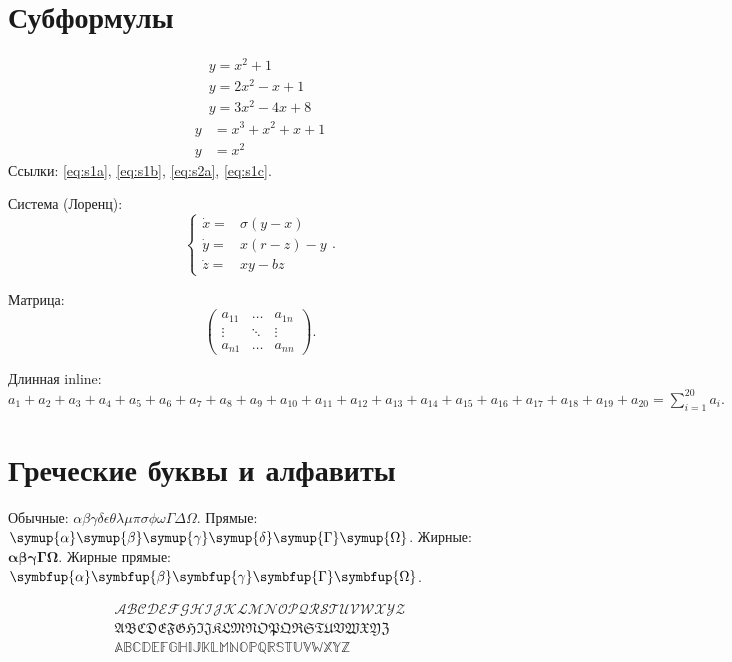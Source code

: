 \documentclass[font=modern]{cmcmsuthesis-doctoral}
\begin{document}
\section{Субформулы}
\begin{subequations}\label{eq:sub1}\begin{gather}y=x^2+1\label{eq:s1a}\\y=2x^2-x+1\label{eq:s1b}\\y=3x^2-4x+8\label{eq:s1c}\end{gather}\end{subequations}
\begin{subequations}\label{eq:sub2}\begin{align}y&=x^3+x^2+x+1\label{eq:s2a}\\y&=x^2\label{eq:s2b}\end{align}\end{subequations}
Ссылки: \eqref{eq:s1a}, \eqref{eq:s1b}, \eqref{eq:s2a}, \eqref{eq:s1c}.

Система (Лоренц): \[\left\{\begin{array}{rl}\dot x=&\sigma(y-x)\\\dot y=&x(r-z)-y\\\dot z=&xy-bz\end{array}\right..\]

Матрица: \[\left(\begin{array}{ccc}a_{11}&\ldots&a_{1n}\\\vdots&\ddots&\vdots\\a_{n1}&\ldots&a_{nn}\end{array}\right).\]

Длинная inline: $a_1+a_2+a_3+a_4+a_5+a_6+a_7+a_8+a_9+a_{10}+a_{11}+a_{12}+a_{13}+a_{14}+a_{15}+a_{16}+a_{17}+a_{18}+a_{19}+a_{20}=\sum_{i=1}^{20}a_i.$

\section{Греческие буквы и алфавиты}
Обычные: $\alpha\beta\gamma\delta\epsilon\theta\lambda\mu\pi\sigma\phi\omega\Gamma\Delta\Omega$.
Прямые: $\symup{\alpha}\symup{\beta}\symup{\gamma}\symup{\delta}\symup{\Gamma}\symup{\Omega}$.
Жирные: $\symbf{\alpha}\symbf{\beta}\symbf{\gamma}\symbf{\Gamma}\symbf{\Omega}$.
Жирные прямые: $\symbfup{\alpha}\symbfup{\beta}\symbfup{\gamma}\symbfup{\Gamma}\symbfup{\Omega}$.

\[\begin{aligned}\mathcal{ABCDEFGHIJKLMNOPQRSTUVWXYZ}\\\mathfrak{ABCDEFGHIJKLMNOPQRSTUVWXYZ}\\\mathbb{ABCDEFGHIJKLMNOPQRSTUVWXYZ}\end{aligned}\]
\end{document}
